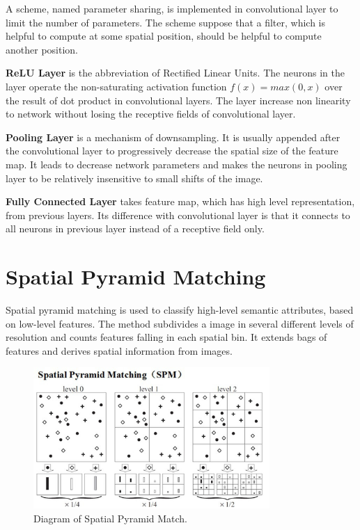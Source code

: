 A scheme, named parameter sharing, is implemented in convolutional layer to limit the number of parameters. The scheme suppose that a filter, which is helpful to compute at some spatial position, should be helpful to compute another position.

\textbf{ReLU Layer} is the abbreviation of Rectified Linear Units. The neurons in the layer operate the non-saturating activation function $f(x) = max(0,x)$ over the result of dot product in convolutional layers. The layer increase non linearity to network without losing the receptive fields of convolutional layer.

\textbf{Pooling Layer} is a mechanism of downsampling. It is usually appended after the convolutional layer to progressively decrease the spatial size of the feature map. It leads to decrease network parameters and makes the neurons in pooling layer to be relatively insensitive to small shifts of the image.

\textbf{Fully Connected Layer} takes feature map, which has high level representation, from previous layers. Its difference with convolutional layer is that it connects to all neurons in previous layer instead of a receptive field only.

\section{Spatial Pyramid Matching}

Spatial pyramid matching\citep{lazebnik2006beyond} is used to classify high-level semantic attributes, based on low-level features. The method subdivides a image in several different levels of resolution and counts features falling in each spatial bin. It extends bags of features and derives spatial information from images.
\graphicspath{ {./Figures/} }
\begin{figure}[!htb]
\centering
\includegraphics[width=0.8\textwidth]{spm.jpg}
\caption{\label{fig:perceptron}Diagram of Spatial Pyramid Match.}
\end{figure}

